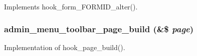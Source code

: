 \label{admin__menu__toolbar_8module_aae5cecf58b2e516927281143d392927e}
Implements hook\_\-form\_\-FORMID\_\-alter(). \hypertarget{admin__menu__toolbar_8module_a398c1718f88449b886028877688a4864}{
\subsubsection[{admin\_\-menu\_\-toolbar\_\-page\_\-build}]{\setlength{\rightskip}{0pt plus 5cm}admin\_\-menu\_\-toolbar\_\-page\_\-build (\&\$ {\em page})}}
\label{admin__menu__toolbar_8module_a398c1718f88449b886028877688a4864}
Implementation of hook\_\-page\_\-build(). 